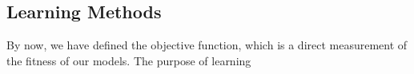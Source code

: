 \subsection {Learning Methods}
By now, we have defined the objective function, which is a direct measurement of the fitness of our models. The purpose of learning 